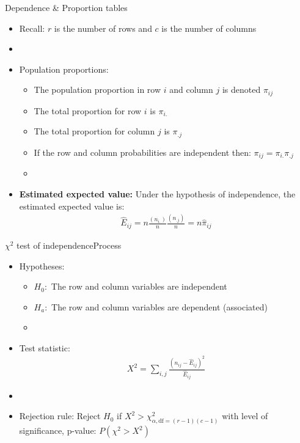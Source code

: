 \documentclass[xcolor=dvipsnames]{beamer}
\begin{document}
\begin{frame}{Dependence \& Proportion tables}
\begin{itemize}
	\item Recall: $r$ is the number of rows and $c$ is the number of columns
	\item[]
	\item Population proportions:
	\begin{itemize}
		\item The population proportion in row $i$ and column $j$ is denoted $\pi_{ij}$
		\item The total proportion for row $i$ is $\pi_{i.}$
		\item The total proportion for column $j$ is $\pi_{.j}$
		\item If the row and column probabilities are independent then: $\pi_{ij}=\pi_{i.}\pi_{.j}$
		\item[]
	\end{itemize}
	\item \textbf{Estimated expected value:} Under the hypothesis of independence, the estimated expected value is:
	\begin{gather*}
		\hat{E}_{ij} =n\frac{(n_{i.})}{n} \frac{(n_{.j})}{n} = n \hat{\pi}_{ij}
	\end{gather*}
\end{itemize}
\end{frame}

\begin{frame}{$\chi^2$ test of independence}{Process}
	\begin{itemize}
		\item Hypotheses:
		\begin{itemize}
			\item $H_0:$ The row and column variables are independent
			\item $H_a:$ The row and column variables are dependent (associated)
			\item[]
		\end{itemize}
	\item Test statistic:
	\begin{gather*}
		X^2 = \sum_{i,j} \frac{(n_{ij}-\hat{E}_{ij})^2}{\hat{E}_{ij}}
	\end{gather*}
	\item[]
	\item Rejection rule: Reject $H_0$ if $X^2 > \chi^2_{\alpha,\text{df}=(r-1)(c-1)}$ with level of significance, p-value: $P(\chi^2 > X^2)$
	\end{itemize}
\end{frame}
\end{document}
